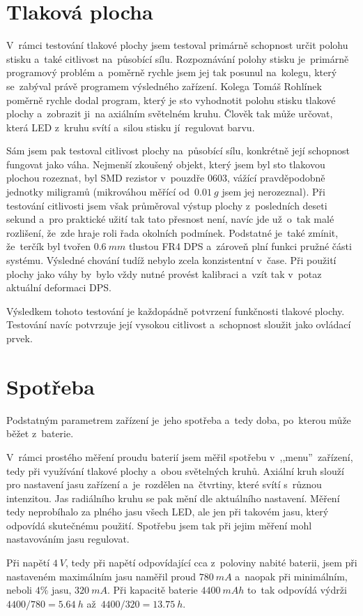 \section{Tlaková plocha \label{popisTlakovky3}}
V~rámci testování tlakové plochy jsem testoval primárně schopnost určit polohu stisku a~také citlivost na~působící sílu.
Rozpoznávání polohy stisku je~primárně programový problém a~poměrně rychle jsem jej tak posunul na~kolegu, který se~zabýval právě programem výsledného zařízení.
Kolega Tomáš Rohlínek poměrně rychle dodal program, který je sto vyhodnotit polohu stisku tlakové plochy a~zobrazit ji~na axiálním světelném kruhu.
Člověk tak může určovat, která LED z~kruhu svítí a~silou stisku jí~regulovat barvu.

Sám jsem pak testoval citlivost plochy na~působící sílu, konkrétně její schopnost fungovat jako váha.
Nejmenší zkoušený objekt, který jsem byl sto tlakovou plochou rozeznat, byl SMD rezistor v~pouzdře 0603, vážící pravděpodobně jednotky miligramů (mikrováhou měřící od~\(0.01~g\) jsem jej nerozeznal).
Při testování citlivosti jsem však průměroval výstup plochy z~posledních deseti sekund a~pro praktické užití tak tato přesnost není, navíc jde už~o~tak malé rozlišení, že~zde hraje roli řada okolních podmínek.
Podstatné je~také zmínit, že~terčík byl tvořen \(0.6~mm\) tlustou FR4 DPS a~zároveň plní funkci pružné části systému.
Výsledné chování tudíž nebylo zcela konzistentní v~čase. Při použití plochy jako váhy by~bylo vždy nutné provést kalibraci a~vzít tak v~potaz aktuální deformaci DPS.

Výsledkem tohoto testování je každopádně potvrzení funkčnosti tlakové plochy.
Testování navíc potvrzuje její vysokou citlivost a~schopnost sloužit jako ovládací prvek.

\section{Spotřeba}
Podstatným parametrem zařízení je~jeho spotřeba a~tedy doba, po~kterou může běžet z~baterie.

V~rámci prostého měření proudu baterií jsem měřil spotřebu v~,,menu''~zařízení, tedy při využívání tlakové plochy a~obou světelných kruhů.
Axiální kruh slouží pro nastavení jasu zařízení a~je~rozdělen na~čtvrtiny, které svítí s~různou intenzitou.
Jas radiálního kruhu se pak mění dle aktuálního nastavení.
Měření tedy neprobíhalo za plného jasu všech LED, ale jen při takovém jasu, který odpovídá skutečnému použití.
Spotřebu jsem tak při jejim měření mohl nastavováním jasu regulovat.

Při napětí \(4~V\), tedy při napětí odpovídající cca z~poloviny nabité baterii, jsem při nastaveném maximálním jasu naměřil proud \(780~mA\) a~naopak při minimálním, neboli \(4 \%\) jasu, \(320~mA\). %
Při kapacitě baterie \(4400~mAh\) to~tak odpovídá výdrži \(4400/780 = 5.64~h\) až~\(4400/320 = 13.75~h\).
